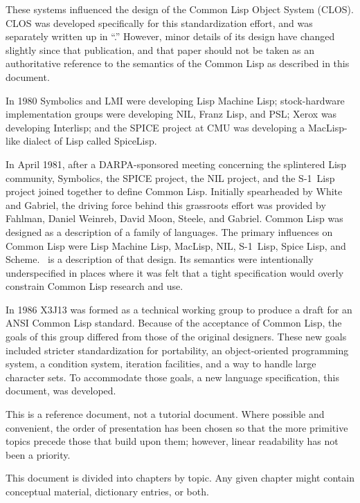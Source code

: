 These systems influenced the design of the Common Lisp Object System (CLOS). CLOS was developed specifically for this standardization effort, and was separately written up in ``\CLOSPaper.''  However, minor details of its design have changed slightly since that publication, and that paper  should not be taken as an authoritative reference to the semantics of the Common Lisp as described in this document.

In 1980 Symbolics and LMI were developing Lisp Machine Lisp; stock-hardware implementation groups were developing NIL, Franz Lisp, and PSL; Xerox was developing Interlisp; and the SPICE project at CMU was developing a MacLisp-like dialect of Lisp called SpiceLisp.

In April 1981, after a DARPA-sponsored meeting concerning the splintered Lisp community, Symbolics, the SPICE project, the NIL project, and the \hbox{S-1}~Lisp project joined together to define Common Lisp.  Initially spearheaded by White and Gabriel, the driving force behind this grassroots effort was provided by Fahlman, Daniel Weinreb, David Moon, Steele,  and Gabriel. Common Lisp was designed as a description of a family of languages.  The primary influences on Common Lisp were Lisp Machine Lisp, MacLisp, NIL, \hbox{S-1}~Lisp, Spice Lisp, and Scheme. \CLtL\ is a description of that design.  Its semantics were intentionally underspecified in places where it was felt that a tight specification would overly constrain Common Lisp research and use.

In 1986 X3J13 was formed as a technical working group to produce a draft for an ANSI Common Lisp standard. Because of the acceptance of Common Lisp, the goals of this group differed from those of the original designers. These new goals included stricter standardization for portability, an object-oriented programming system, a condition system, iteration facilities, and a way to handle large character sets.  To accommodate those goals, a new language specification, this document, was developed.
\endsubSection%

\endSection%


This is a reference document, not a tutorial document.  Where possible and convenient, the order of presentation has been chosen so that the more primitive topics precede those that build upon them;  however, linear readability has not been a priority.

This document is divided into chapters by topic. Any given chapter might contain conceptual material, dictionary entries, or both.

